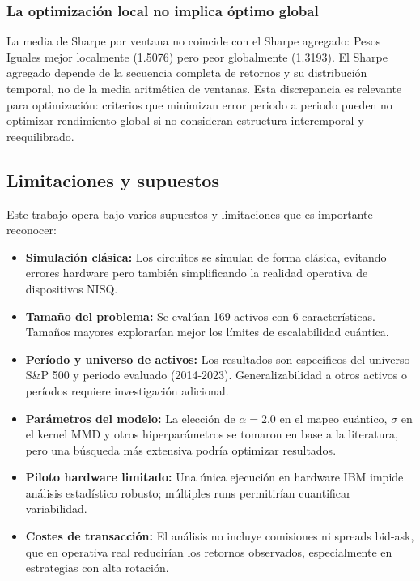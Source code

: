 \subsubsection{La optimización local no implica óptimo global}
La media de Sharpe por ventana no coincide con el Sharpe agregado: Pesos Iguales mejor localmente (1.5076) pero peor globalmente (1.3193). El Sharpe agregado depende de la secuencia completa de retornos y su distribución temporal, no de la media aritmética de ventanas. Esta discrepancia es relevante para optimización: criterios que minimizan error periodo a periodo pueden no optimizar rendimiento global si no consideran estructura interemporal y reequilibrado.

\subsection{Limitaciones y supuestos}

Este trabajo opera bajo varios supuestos y limitaciones que es importante reconocer:

\begin{itemize}
	\item \textbf{Simulación clásica:} Los circuitos se simulan de forma clásica, evitando errores hardware pero también simplificando la realidad operativa de dispositivos NISQ.
	\item \textbf{Tamaño del problema:} Se evalúan 169 activos con 6 características. Tamaños mayores explorarían mejor los límites de escalabilidad cuántica.
	\item \textbf{Período y universo de activos:} Los resultados son específicos del universo S\&P 500 y periodo evaluado (2014-2023). Generalizabilidad a otros activos o períodos requiere investigación adicional.
	\item \textbf{Parámetros del modelo:} La elección de $\alpha=2.0$ en el mapeo cuántico, $\sigma$ en el kernel MMD y otros hiperparámetros se tomaron en base a la literatura, pero una búsqueda más extensiva podría optimizar resultados.
	\item \textbf{Piloto hardware limitado:} Una única ejecución en hardware IBM impide análisis estadístico robusto; múltiples runs permitirían cuantificar variabilidad.
	\item \textbf{Costes de transacción:} El análisis no incluye comisiones ni spreads bid-ask, que en operativa real reducirían los retornos observados, especialmente en estrategias con alta rotación.
\end{itemize}

